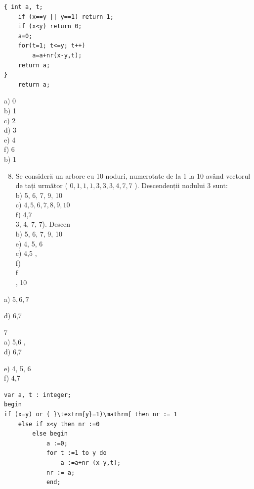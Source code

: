 \documentclass[10pt]{article}
\begin{document}
\begin{verbatim}
{ int a, t;
    if (x==y || y==1) return 1;
    if (x<y) return 0;
    a=0;
    for(t=1; t<=y; t++)
        a=a+nr(x-y,t);
    return a;
}
    return a;
\end{verbatim}

a) 0\\
b) 1\\
c) 2\\
d) 3\\
e) 4\\
f) 6\\
b) 1

\begin{enumerate}
  \setcounter{enumi}{7}
  \item Se consideră un arbore cu 10 noduri, numerotate de la 1 la 10 având vectorul de tați următor ( $0,1,1,1,3,3,3,4,7,7$ ). Descendenții nodului 3 sunt:\\
b) 5, 6, 7, 9, 10\\
c) $4,5,6,7,8,9,10$\\
f) 4,7\\
3, 4, 7, 7). Descen\\
b) 5, 6, 7, 9, 10\\
e) 4, 5, 6\\
c) 4,5 ,\\
f)\\
f\\
, 10
\end{enumerate}

a) $5,6,7$

d) 6,7

7\\
a) 5,6 ,\\
d) 6,7

e) 4, 5, 6\\
f) 4,7

\begin{verbatim}
var a, t : integer;
begin
if (x=y) or ( }\textrm{y}=1)\mathrm{ then nr := 1
    else if x<y then nr :=0
        else begin
            a :=0;
            for t :=1 to y do
                a :=a+nr (x-y,t);
            nr := a;
            end;
\end{verbatim}
\end{document}
